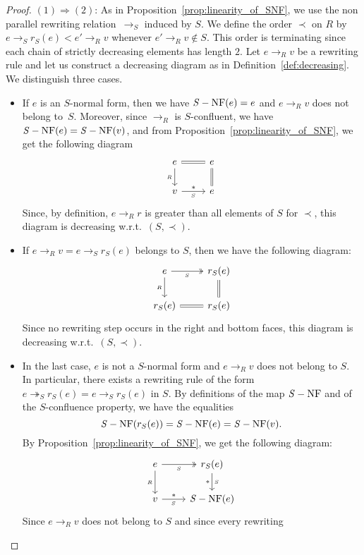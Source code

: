 \documentclass[10pt]{easychair}
\theoremstyle{definition}
\newcommand\rewR{\to_R}
\newcommand\parS{\twoheadrightarrow_S}
\DeclareMathOperator{\SNF}{{\it S}-NF}
\begin{document}
\begin{proof}
  $(1)\Rightarrow (2)$: As in Proposition~\ref{prop:linearity_of_SNF}, we
  use the non parallel rewriting relation~$\to_S$ induced by $S$. We
  define the order $\prec$ on $R$ by $e\to_S r_S(e)<e'\rewR v$ whenever
  $e'\rewR v\notin S$. This order is terminating since each chain of
  strictly decreasing elements has length $2$. Let $e\rewR v$ be a
  rewriting rule and let us construct a decreasing diagram as in
  Definition~\ref{def:decreasing}. We distinguish three cases.
  \begin{itemize}
  \item If $e$ is an $S$-normal form, then we have $\SNF(e)=e$ and
    $e\rewR v$ does not belong to~$S$. Moreover, since $\rewR$ is
    $S$-confluent, we have $\SNF(e)=\SNF(v)$, and from
    Proposition~\ref{prop:linearity_of_SNF}, we get the following diagram
    \[\begin{tikzcd}
    e\ar[d, "_R"']\ar[r, equal] &
    e\ar[d, equal]\\
    v\ar[r, "*", "_S"'] & e
    \end{tikzcd}\]
    Since, by definition, $e\rewR r$ is greater than all elements of $S$ 
    for $\prec$, this diagram is decreasing w.r.t.\ $(S,\prec)$. 
  \item If $e\rewR v=e\to_S r_S(e)$ belongs to $S$, then we have the 
    following diagram:
    \[\begin{tikzcd}
    e\ar[r, twoheadrightarrow, "_S"']\ar[d, "_R"']
    & r_S(e) \ar[equal, d]\\
    r_S(e)\ar[r, equal] & r_S(e)
    \end{tikzcd}\]
    Since no rewriting step occurs in the right and bottom faces, this
    diagram is decreasing w.r.t.\ $(S,\prec)$.
  \item In the last case, $e$ is not a $S$-normal form and $e\rewR v$
    does not belong to $S$. In particular, there exists a rewriting rule
    of the form $e\parS r_S(e)=e\to_S r_S(e)$ in $S$. By definitions of
    the map $\SNF$ and of the $S$-confluence property, we have the
    equalities
    \[\SNF(r_S(e))=\SNF(e)=\SNF(v).
    \smallskip\]
    By Proposition~\ref{prop:linearity_of_SNF}, we get the following
    diagram:
    \[\begin{tikzcd}
    e\ar[d, "_R"']\ar[r, twoheadrightarrow, "_S"'] &
    r_S(e) \ar["_S", "*"', d] \\
    v \ar[r, "_S"', "*"] & \SNF (e)
    \end{tikzcd}\]
    Since $e\rewR v$ does not belong to $S$ and since every rewriting

\end{itemize}
\end{proof}
\end{document}
